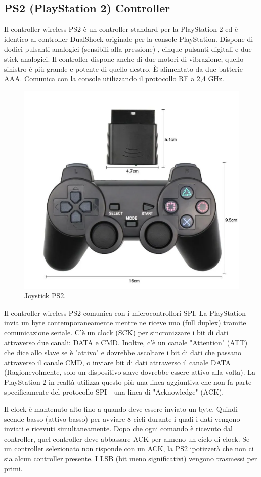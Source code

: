 \documentclass{article}
\begin{document}
\subsection{PS2 (PlayStation 2) Controller}
Il controller wireless PS2 è un controller standard per la PlayStation 2 ed è identico al controller DualShock originale per la console PlayStation. Dispone di dodici pulsanti analogici (sensibili alla pressione) , cinque pulsanti digitali  e due stick analogici. Il controller dispone anche di due motori di vibrazione, quello sinistro è più grande e potente di quello destro. È alimentato da due batterie AAA. Comunica con la console utilizzando il protocollo RF a 2,4 GHz.
\begin{figure}[H]
\centering
\includegraphics[width=0.7\linewidth]{image/joystick.png}
\caption{\label{joystick:pot} Joystick PS2.}
\end{figure}


Il controller wireless PS2 comunica con i microcontrollori SPI. La PlayStation invia un byte contemporaneamente mentre ne riceve uno (full duplex) tramite comunicazione seriale. C'è un clock (SCK) per sincronizzare i bit di dati attraverso due canali: DATA e CMD. Inoltre, c'è un canale "Attention" (ATT) che dice allo slave se è "attivo" e dovrebbe ascoltare i bit di dati che passano attraverso il canale CMD, o inviare bit di dati attraverso il canale DATA (Ragionevolmente, solo un dispositivo slave dovrebbe essere attivo alla volta). La PlayStation 2 in realtà utilizza questo più una linea aggiuntiva che non fa parte specificamente del protocollo SPI - una linea di "Acknowledge" (ACK).

Il clock è mantenuto alto fino a quando deve essere inviato un byte. Quindi scende basso (attivo basso) per avviare 8 cicli durante i quali i dati vengono inviati e ricevuti simultaneamente. Dopo che ogni comando è ricevuto dal controller, quel controller deve abbassare ACK per almeno un ciclo di clock. Se un controller selezionato non risponde con un ACK, la PS2 ipotizzerà che non ci sia alcun controller presente. I LSB (bit meno significativi) vengono trasmessi per primi.
\end{document}
